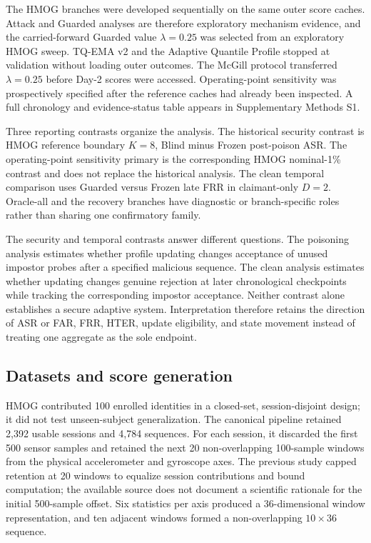 \documentclass[technologies,article,submit,moreauthors]{Definitions/mdpi}
\begin{document}
The HMOG branches were developed sequentially on the same outer score caches. Attack and Guarded analyses are therefore exploratory mechanism evidence, and the carried-forward Guarded value \(\lambda=0.25\) was selected from an exploratory HMOG sweep. TQ-EMA v2 and the Adaptive Quantile Profile stopped at validation without loading outer outcomes. The McGill protocol transferred \(\lambda=0.25\) before Day-2 scores were accessed. Operating-point sensitivity was prospectively specified after the reference caches had already been inspected. A full chronology and evidence-status table appears in Supplementary Methods S1.

Three reporting contrasts organize the analysis. The historical security contrast is HMOG reference boundary \(K=8\), Blind minus Frozen post-poison ASR. The operating-point sensitivity primary is the corresponding HMOG nominal-1\% contrast and does not replace the historical analysis. The clean temporal comparison uses Guarded versus Frozen late FRR in claimant-only \(D=2\). Oracle-all and the recovery branches have diagnostic or branch-specific roles rather than sharing one confirmatory family.

The security and temporal contrasts answer different questions. The poisoning analysis estimates whether profile updating changes acceptance of unused impostor probes after a specified malicious sequence. The clean analysis estimates whether updating changes genuine rejection at later chronological checkpoints while tracking the corresponding impostor acceptance. Neither contrast alone establishes a secure adaptive system. Interpretation therefore retains the direction of ASR or FAR, FRR, HTER, update eligibility, and state movement instead of treating one aggregate as the sole endpoint.

\subsection{Datasets and score generation}\label{sec:datasets-and-score-generation}

HMOG contributed 100 enrolled identities in a closed-set, session-disjoint design; it did not test unseen-subject generalization. The canonical pipeline retained 2,392 usable sessions and 4,784 sequences. For each session, it discarded the first 500 sensor samples and retained the next 20 non-overlapping 100-sample windows from the physical accelerometer and gyroscope axes. The previous study capped retention at 20 windows to equalize session contributions and bound computation; the available source does not document a scientific rationale for the initial 500-sample offset. Six statistics per axis produced a 36-dimensional window representation, and ten adjacent windows formed a non-overlapping \(10\times36\) sequence.
\end{document}

